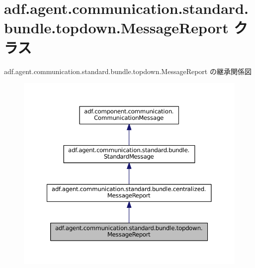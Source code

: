\hypertarget{classadf_1_1agent_1_1communication_1_1standard_1_1bundle_1_1topdown_1_1MessageReport}{}\section{adf.\+agent.\+communication.\+standard.\+bundle.\+topdown.\+Message\+Report クラス}
\label{classadf_1_1agent_1_1communication_1_1standard_1_1bundle_1_1topdown_1_1MessageReport}


adf.\+agent.\+communication.\+standard.\+bundle.\+topdown.\+Message\+Report の継承関係図
\nopagebreak
\begin{figure}[H]
\begin{center}
\leavevmode
\includegraphics[width=350pt]{classadf_1_1agent_1_1communication_1_1standard_1_1bundle_1_1topdown_1_1MessageReport__inherit__graph}
\end{center}
\end{figure}


